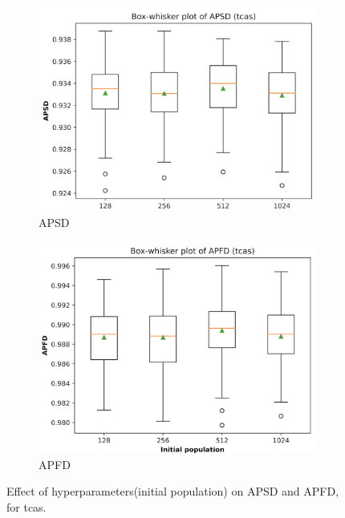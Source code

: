 \documentclass[10pt,journal,compsoc]{IEEEtran}
\begin{document}
	
	\begin{figure}
		\centering
		\begin{subfigure}[b]{0.4\linewidth}
			\centering
			\includegraphics[width=\textwidth]{hyperparam/apsd.png}
			\caption{APSD}
		\end{subfigure}
		\hfill
		\begin{subfigure}[b]{0.4\linewidth}
			\centering
			\includegraphics[width=\textwidth]{hyperparam/apfd.png}
			\caption{APFD}
		\end{subfigure}
		\caption{Effect of hyperparameters(initial population) on APSD and APFD, for tcas.}
		\label{fig:hyperparam}
	\end{figure}
	
\end{document}
